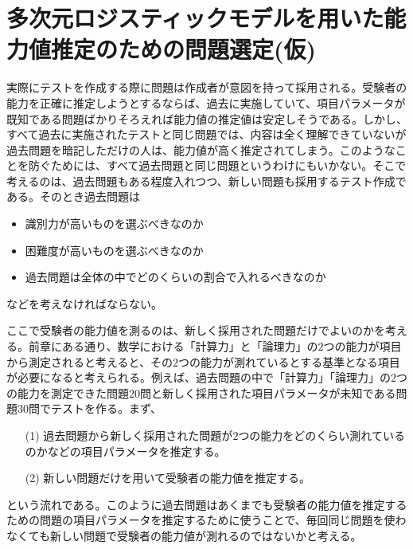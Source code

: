 \documentclass[12pt]{jarticle}
\numberwithin{equation}{subsection}
\begin{document}
\section{多次元ロジスティックモデルを用いた能力値推定のための問題選定(仮)}
実際にテストを作成する際に問題は作成者が意図を持って採用される。受験者の能力を正確に推定しようとするならば、過去に実施していて、項目パラメータが既知である問題ばかりそろえれば能力値の推定値は安定しそうである。しかし、すべて過去に実施されたテストと同じ問題では、内容は全く理解できていないが過去問題を暗記しただけの人は、能力値が高く推定されてしまう。このようなことを防ぐためには、すべて過去問題と同じ問題というわけにもいかない。そこで考えるのは、過去問題もある程度入れつつ、新しい問題も採用するテスト作成である。そのとき過去問題は
\begin{itemize}
  \item 識別力が高いものを選ぶべきなのか
  \item 困難度が高いものを選ぶべきなのか
  \item 過去問題は全体の中でどのくらいの割合で入れるべきなのか
\end{itemize}
などを考えなければならない。

ここで受験者の能力値を測るのは、新しく採用された問題だけでよいのかを考える。前章にある通り、数学における「計算力」と「論理力」の$2$つの能力が項目から測定されると考えると、その$2$つの能力が測れているとする基準となる項目が必要になると考えられる。例えば、過去問題の中で「計算力」「論理力」の$2$つの能力を測定できた問題$20$問と新しく採用された項目パラメータが未知である問題$30$問でテストを作る。まず、
\begin{itemize}
  \item[(1)] 過去問題から新しく採用された問題が$2$つの能力をどのくらい測れているのかなどの項目パラメータを推定する。
  \item[(2)] 新しい問題だけを用いて受験者の能力値を推定する。
\end{itemize}
という流れである。このように過去問題はあくまでも受験者の能力値を推定するための問題の項目パラメータを推定するために使うことで、毎回同じ問題を使わなくても新しい問題で受験者の能力値が測れるのではないかと考える。
\end{document}
